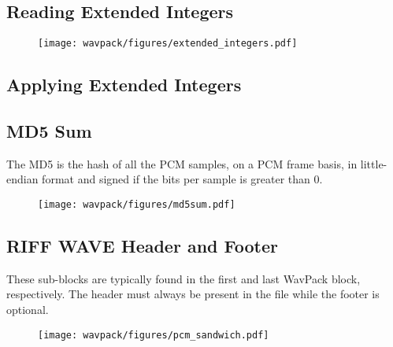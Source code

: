 \subsection{Reading Extended Integers}
\label{wavpack:read_extended_integers}


\begin{figure}[h]
  \texttt{[image: wavpack/figures/extended\_integers.pdf]}
\end{figure}

\subsection{Applying Extended Integers}
\label{wavpack:apply_extended_integers}
{
  
}

\clearpage

\subsection{MD5 Sum}
\label{wavpack:md5_sum}
The MD5 is the hash of all the PCM samples, on a PCM frame basis,
in little-endian format and signed if the bits per sample is greater than 0.

\begin{figure}[h]
\texttt{[image: wavpack/figures/md5sum.pdf]}
\end{figure}

\subsection{RIFF WAVE Header and Footer}

These sub-blocks are typically found in the first and last
WavPack block, respectively.
The header must always be present in the file while
the footer is optional.

\begin{figure}[h]
\texttt{[image: wavpack/figures/pcm\_sandwich.pdf]}
\end{figure}

